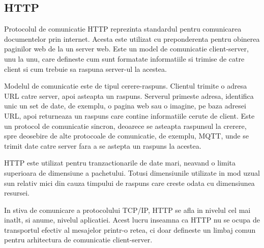 \subsection{HTTP}\label{sec:http}
Protocolul de comunicatie HTTP reprezinta standardul pentru comunicarea documentelor prin internet. Acesta este utilizat cu preponderenta pentru obinerea paginilor 
web de la un server web. Este un model de comunicatie client-server, unu la unu, care defineste cum sunt formatate informatiile si trimise de catre client si 
cum trebuie sa raspuna server-ul la acestea.

Modelul de comunicatie este de tipul cerere-raspuns. Clientul trimite o adresa URL catre server, apoi asteapta un raspuns. Serverul primeste adresa, 
identifica unic un set de date, de exemplu, o pagina web sau o imagine, pe baza adresei URL, apoi returneaza un raspuns care contine informatiile cerute 
de client. Este un protocol de comunicatie sincron, deoarece se asteapta raspunsul la crerere, spre deosebire de alte protocoale de comunicatie, 
de exemplu, MQTT, unde se trimit date catre server fara a se astepta un raspuns la acestea.

HTTP este utilizat pentru tranzactionarile de date mari, neavand o limita superioara de dimensiune a pachetului. Totusi dimensiunile utilizate in mod 
uzual sun relativ mici din cauza timpului de raspuns care creste odata cu dimensiunea resursei.

In stiva de comunicare a protocolului TCP/IP, HTTP se afla in nivelul cel mai inatlt, si anume, nivelul aplicatiei. Acest lucru inseamna ca HTTP nu se 
ocupa de transportul efectiv al mesajelor printr-o retea, ci doar defineste un limbaj comun pentru arhitectura de comunicatie client-server.  

